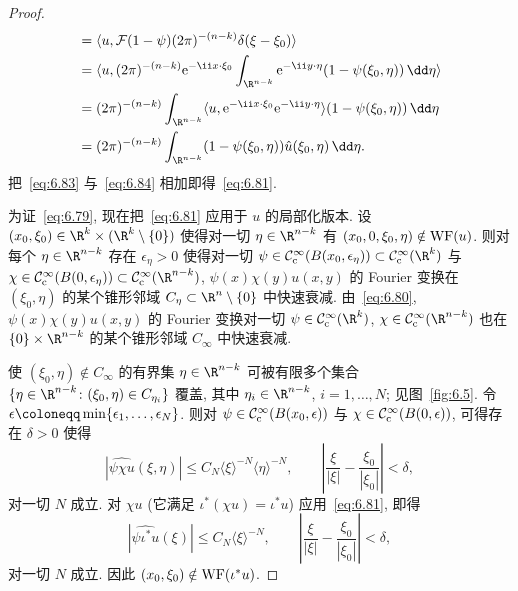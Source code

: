 \begin{proof}
\begin{equation}
\begin{aligned}
    & = \langle u, \mathcal{F}(1 - \psi)(2\pi)^{-(n-k)}\delta(\xi - \xi_0) \rangle \\
    & = \langle u, (2\pi)^{-(n-k)} \ee^{-\ii x \cdot \xi_0} \int_{\R^{n-k}} \ee^{-\ii y \cdot \eta}(1 - \psi(\xi_0, \eta)) \,\dd\eta \rangle \\
    & = (2\pi)^{-(n-k)} \int_{\R^{n-k}} \langle u, \ee^{-\ii x \cdot \xi_0}\ee^{-\ii y \cdot \eta} \rangle (1 - \psi(\xi_0, \eta)) \,\dd\eta \\
    & = (2\pi)^{-(n-k)} \int_{\R^{n-k}} (1 - \psi(\xi_0, \eta)) \hat{u}(\xi_0, \eta) \,\dd\eta.
\end{aligned}
\end{equation}
把~\eqref{eq:6.83} 与~\eqref{eq:6.84} 相加即得~\eqref{eq:6.81}.

为证~\eqref{eq:6.79}, 现在把~\eqref{eq:6.81} 应用于 $u$ 的局部化版本. 设 $(x_0, \xi_0) \in \R^k \times (\R^k \setminus \{0\})$ 使得对一切 $\eta \in \R^{n-k}$ 有 $(x_0, 0, \xi_0, \eta) \notin \operatorname{WF}(u)$. 则对每个 $\eta \in \R^{n-k}$ 存在 $\epsilon_\eta > 0$ 使得对一切 $\psi \in \SmoothComp(B(x_0, \epsilon_\eta)) \subset \SmoothComp(\R^k)$ 与 $\chi \in \SmoothComp(B(0, \epsilon_\eta)) \subset \SmoothComp(\R^{n-k})$, $\psi(x)\chi(y)u(x, y)$ 的 Fourier 变换在 $(\xi_0, \eta)$ 的某个锥形邻域 $C_\eta \subset \R^n \setminus \{0\}$ 中快速衰减. 由~\eqref{eq:6.80}, $\psi(x)\chi(y)u(x, y)$ 的 Fourier 变换对一切 $\psi \in \SmoothComp(\R^k)$, $\chi \in \SmoothComp(\R^{n-k})$ 也在 $\{0\} \times \R^{n-k}$ 的某个锥形邻域 $C_\infty$ 中快速衰减.

使 $(\xi_0, \eta) \notin C_\infty$ 的有界集 $\eta \in \R^{n-k}$ 可被有限多个集合 $\{\eta \in \R^{n-k} \colon (\xi_0, \eta) \in C_{\eta_i}\}$ 覆盖, 其中 $\eta_i \in \R^{n-k}$, $i = 1, \ldots, N$; 见图~\ref{fig:6.5}. 令 $\epsilon \defeq \min\{\epsilon_1, \ldots, \epsilon_N\}$. 则对 $\psi \in \mathcal{C}_{\mathrm{c}}^\infty(B(x_0, \epsilon))$ 与 $\chi \in \mathcal{C}_{\mathrm{c}}^\infty(B(0, \epsilon))$, 可得存在 $\delta > 0$ 使得
\begin{equation}\label{eq:6.85}
    |\widehat{\psi\chi u}(\xi, \eta)| \le C_N \langle \xi \rangle^{-N} \langle \eta \rangle^{-N}, \qquad \left| \frac{\xi}{|\xi|} - \frac{\xi_0}{|\xi_0|} \right| < \delta,
\end{equation}
对一切 $N$ 成立. 对 $\chi u$ (它满足 $\iota^*(\chi u) = \iota^* u$) 应用~\eqref{eq:6.81}, 即得
\begin{equation}\label{eq:6.86}
    |\widehat{\psi \iota^* u}(\xi)| \le C_N \langle \xi \rangle^{-N}, \qquad \left| \frac{\xi}{|\xi|} - \frac{\xi_0}{|\xi_0|} \right| < \delta,
\end{equation}
对一切 $N$ 成立. 因此 $(x_0, \xi_0) \notin \operatorname{WF}(\iota^* u)$.
\end{proof}

